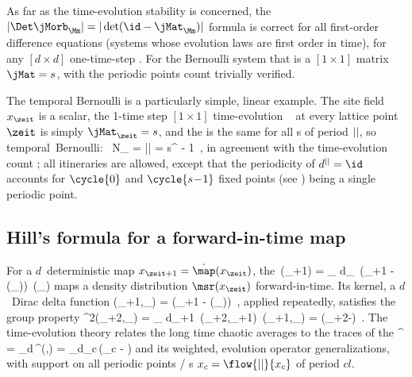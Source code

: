 As far as the time-evolution stability is concerned, the
$|\Det\jMorb_\Mm|=|\det (\id-\jMat_\Mm)|$ formula  is
correct for all first-order difference equations (systems whose evolution
laws are first order in time), for any $[d\times{d}]$ one-time-step
{\jacobianM}. For the Bernoulli system that is a $[1\!\times\!1]$ matrix
$\jMat=s$, with the periodic points count  trivially
verified.

The temporal {Bernoulli}  is a particularly simple, linear  example.
The site field $\ssp_\zeit$ is a scalar,
the 1-time step $[1\!\times\!1]$ time-evolution \jacobianM\
 at every lattice point $\zeit$ is simply
$\jMat_{\zeit}={s}$,
and
the {\jacobianOrb}
 is the same for all {\lattstate}s of period ${||}$,
so
\beq
\mbox{temporal {Bernoulli}: }\quad
N_\cl{} = |\Det\jMorb| = {s}^{\cl{}} - 1
\,,
in agreement with the time-evolution count ; all
itineraries are allowed, except that the periodicity of
$\shift^\cl{}=\id$ accounts for $\cycle{0}$ and
$\cycle{s\!-\!1}$ fixed points (see ) being a
single periodic point.



\subsection{Hill's formula for a for\-ward-in-time map}
\label{s:LC21forwardHill}

For a $d$\dmn\ deterministic map $\ssp_{\zeit+1} = \hat{\map}(\ssp_{\zeit})$, the
{\FPoper}
\beq
     \Lop\,\msr(\ssp_{\zeit+1})
= \int_\pS\!\! d\ssp_{\zeit}\,
           \delta(\ssp_{\zeit+1} - \hat{\map}(\ssp_{\zeit}))\,
           \msr(\ssp_{\zeit})
maps a density distribution $\msr(\ssp_{\zeit})$ for\-ward-in-time.
Its kernel, a $d$\dmn\ Dirac delta function
\bea
\Lop(\ssp_{\zeit+1},\ssp_{\zeit})
    = \delta(\ssp_{\zeit+1} - \hat{\map}(\ssp_{\zeit}))
\,,
\eea
applied repeatedly, satisfies the group property
\beq
\Lop^2(\ssp_{\zeit+2},\ssp_{\zeit})
    = \int_\pS\!\! d\ssp_{\zeit+1}\,
            \Lop(\ssp_{\zeit+2},\ssp_{\zeit+1})\,
            \Lop(\ssp_{\zeit+1},\ssp_{\zeit})
    = \delta(\ssp_{\zeit+2}-)
\,.
The time-evolution {\po} theory relates the
long time chaotic averages to the traces of the {\FPoper}
\beq
\tr\Lop^\cl{}
     = \int_\pS\!\!d\ssp\,\Lop^\cl{}(\ssp,\ssp)
     = \int_\pS\!\!d\ssp_{c}\,\delta(\ssp_{c} - )
\eeq
and its weighted, evolution operator generalizations, with support on all
periodic points / {\lattstate}s   $\ssp_{c}=\flow{\cl{}}{\ssp_c}$ of
period $cl{}$.

